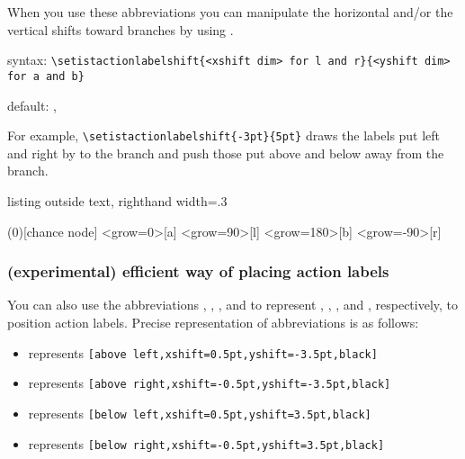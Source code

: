 When you use these abbreviations you can manipulate the horizontal and/or the vertical shifts toward branches by using \cmd{\setistactionlabelshift}.

syntax: \verb|\setistactionlabelshift{<xshift dim> for l and r}{<yshift dim> for a and b}|

default: , 

For example, \verb|\setistactionlabelshift{-3pt}{5pt}| draws the labels put left and right by \xword{3pt} to the branch and push those put above and below \xword{5pt} away from the branch.

\begin{tcblisting}{listing outside text, righthand width=.3\linewidth}
\begin{istgame}[scale=1.2]
\xtShowTerminalNodes
\setistactionlabelshift{-3pt}{5pt} %
\xtdistance{12mm}{16mm}
\istroot(0)[chance node]
  \istb<grow=0>{}[a]
  \istb<grow=90>{}[l]
  \istb<grow=180>{}[b]
  \istb<grow=-90>{}[r]
  \endist
\end{istgame}
\end{tcblisting}


\subsubsection*{(experimental) efficient way of placing action labels}

You can also use the abbreviations , , , and  to represent
, , , and , respectively,
to position action labels. Precise representation of abbreviations is as follows:
\begin{itemize}\tightlist
\item \xword{[al]} represents \verb|[above left,xshift=0.5pt,yshift=-3.5pt,black]|
\item \xword{[ar]} represents \verb|[above right,xshift=-0.5pt,yshift=-3.5pt,black]|
\item \xword{[bl]} represents \verb|[below left,xshift=0.5pt,yshift=3.5pt,black]|
\item \xword{[br]} represents \verb|[below right,xshift=-0.5pt,yshift=3.5pt,black]|
\end{itemize}


